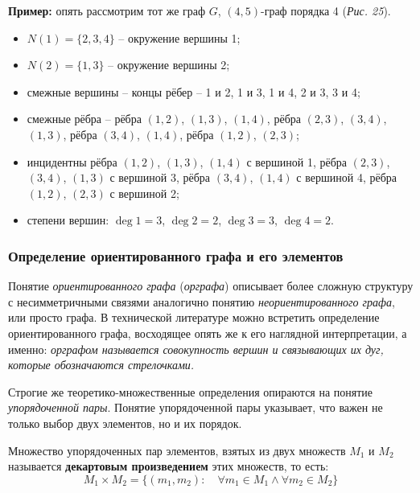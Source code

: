 \documentclass[12pt, a4paper]{article}
\begin{document}
\textbf{Пример:} опять рассмотрим тот же граф $G$, $(4,5)$-граф порядка 4 (\textit{Рис. 25}).
\begin{itemize}
 \item $N(1) = \{ 2,3,4 \}$ -- окружение вершины 1;
 \item $N(2) = \{ 1,3 \}$ -- окружение вершины 2;
 \item смежные вершины -- концы рёбер -- 1 и 2, 1 и 3, 1 и 4, 2 и 3, 3 и 4;
 
 \item смежные рёбра -- рёбра $(1,2)$, $(1,3)$, $(1,4)$, рёбра $(2,3)$, $(3,4)$, $(1,3)$, рёбра $(3,4)$, $(1,4)$, рёбра $(1,2)$, $(2,3)$;
 \item инцидентны рёбра $(1,2)$, $(1,3)$, $(1,4)$ с вершиной 1, рёбра $(2,3)$, $(3,4)$, $(1,3)$ с вершиной 3, рёбра $(3,4)$, $(1,4)$ с вершиной 4, рёбра $(1,2)$, $(2,3)$ с вершиной 2;
 \item степени вершин: $\deg 1=3$, $\deg 2=2$, $\deg 3=3$, $\deg 4=2$.
\end{itemize}

\subsubsection{Определение ориентированного графа и его элементов}

Понятие \textit{ориентированного графа} (\textit{орграфа}) описывает более сложную структуру с несимметричными связями аналогично понятию \textit{неориентированного графа}, или просто графа. В технической литературе можно встретить определение ориентированного графа, восходящее опять же к его наглядной интерпретации, а именно: \textit{орграфом называется совокупность вершин и связывающих их дуг, которые обозначаются стрелочками.}

Строгие же теоретико-множественные определения опираются на понятие \textit{упорядоченной пары}. Понятие упорядоченной пары указывает, что важен не только выбор двух элементов, но и их порядок.

Множество упорядоченных пар элементов, взятых из двух множеств $M_1$ и $M_2$ называется \textbf{декартовым произведением} этих множеств, то есть:
\[M_1 \times M_2 = \{ (m_1, m_2): \quad \forall m_1 \in M_1 \land \forall m_2 \in M_2 \} \]
\end{document}

